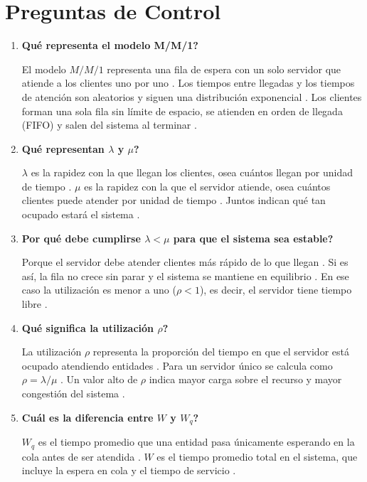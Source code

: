 \documentclass[11pt,a4paper]{article}
\begin{document}
\FloatBarrier
\section{Preguntas de Control}

\begin{enumerate}
    \item \textbf{\textquestiondown{}Qué representa el modelo M/M/1?}
    \par El modelo $M/M/1$ representa una fila de espera con un solo servidor que atiende a los clientes uno por uno \cite{smith2024}. Los tiempos entre llegadas y los tiempos de atención son aleatorios y siguen una distribución exponencial \cite{smith2024, heather2026}. Los clientes forman una sola fila sin límite de espacio, se atienden en orden de llegada (FIFO) y salen del sistema al terminar \cite{smith2024}.

    \item \textbf{\textquestiondown{}Qué representan $\lambda$ y $\mu$?}
    \par $\lambda$ es la rapidez con la que llegan los clientes, osea cuántos llegan por unidad de tiempo \cite{smith2024}. $\mu$ es la rapidez con la que el servidor atiende, osea cuántos clientes puede atender por unidad de tiempo \cite{smith2024, heather2026}. Juntos indican qué tan ocupado estará el sistema \cite{smith2024}.

    \item \textbf{\textquestiondown{}Por qué debe cumplirse $\lambda < \mu$ para que el sistema sea estable?}
    \par Porque el servidor debe atender clientes más rápido de lo que llegan \cite{smith2024}. Si es así, la fila no crece sin parar y el sistema se mantiene en equilibrio \cite{smith2024}. En ese caso la utilización es menor a uno ($\rho < 1$), es decir, el servidor tiene tiempo libre \cite{smith2024}.

    \item \textbf{\textquestiondown{}Qué significa la utilización $\rho$?}
    \par La utilización $\rho$ representa la proporción del tiempo en que el servidor está ocupado atendiendo entidades \cite{smith2024, heather2026}. Para un servidor único se calcula como $\rho = \lambda/\mu$ \cite{smith2024}. Un valor alto de $\rho$ indica mayor carga sobre el recurso y mayor congestión del sistema \cite{smith2024}.

    \item \textbf{\textquestiondown{}Cuál es la diferencia entre $W$ y $W_q$?}
    \par $W_q$ es el tiempo promedio que una entidad pasa únicamente esperando en la cola antes de ser atendida \cite{smith2024, heather2026}. $W$ es el tiempo promedio total en el sistema, que incluye la espera en cola y el tiempo de servicio \cite{smith2024, heather2026}.


\end{enumerate}
\end{document}
